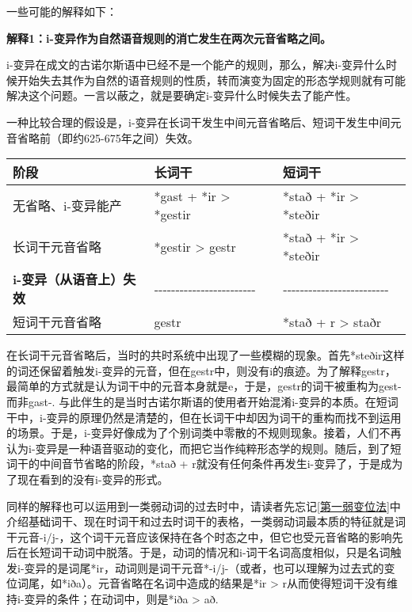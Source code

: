 {{一些可能的解释如下：

\textbf{解释1：i-变异作为自然语音规则的消亡发生在两次元音省略之间。}

i-变异在成文的古诺尔斯语中已经不是一个能产的规则，那么，解决i-变异什么时候开始失去其作为自然的语音规则的性质，转而演变为固定的形态学规则就有可能解决这个问题。一言以蔽之，就是要确定i-变异什么时候失去了能产性。

一种比较合理的假设是，i-变异在长词干发生中间元音省略后、短词干发生中间元音省略前（即约625-675年之间）失效。

\begin{longtable}{lll}
  \toprule
  阶段                    & 长词干                                & 短词干                            \\
  \midrule
  \endhead
  \bottomrule
  \endfoot
  无省略、i-变异能产            & *gast + *ir \textgreater{} *gestir & *stað + *ir
  \textgreater{} *steðir                                                                      \\
  长词干元音省略               & *gestir \textgreater{} gestr       & *stað + *ir
  \textgreater{} *steðir                                                                      \\
  \textbf{i-变异（从语音上）失效} & ‑‑‑‑‑‑‑‑‑‑‑‑‑‑‑‑‑‑‑‑‑‑‑‑           &
  ‑‑‑‑‑‑‑‑‑‑‑‑‑‑‑‑‑‑‑‑‑‑‑‑‑                                                                   \\
  短词干元音省略               & gestr                              & *stað + r \textgreater{} staðr \\
\end{longtable}

在长词干元音省略后，当时的共时系统中出现了一些模糊的现象。首先*steðir这样的词还保留着触发i-变异的元音，但在gestr中，则没有i的痕迹。为了解释gestr，最简单的方式就是认为词干中的元音本身就是e，于是，gestr的词干被重构为gest-而非gast-.
与此伴生的是当时古诺尔斯语的使用者开始混淆i-变异的本质。在短词干中，i-变异的原理仍然是清楚的，但在长词干中却因为词干的重构而找不到运用的场景。于是，i-变异好像成为了个别词类中零散的不规则现象。接着，人们不再认为i-变异是一种语音驱动的变化，而把它当作纯粹形态学的规则。随后，到了短词干的中间音节省略的阶段，*stað
+ r就没有任何条件再发生i-变异了，于是成为了现在看到的没有i-变异的形式。

同样的解释也可以运用到一类弱动词的过去时中，请读者先忘记\ref{第一弱变位法}中介绍基础词干、现在时词干和过去时词干的表格，一类弱动词最本质的特征就是词干元音-i/j-，这个词干元音应该保持在各个时态之中，但它也受元音省略的影响先后在长短词干动词中脱落。于是，动词的情况和i-词干名词高度相似，只是名词触发i-变异的是词尾*ir，动词则是词干元音*-i/j-（或者，也可以理解为过去式的变位词尾，如*iða）。元音省略在名词中造成的结果是*ir
\textgreater{} r从而使得短词干没有维持i-变异的条件；在动词中，则是*iða
\textgreater{} að.

}}
